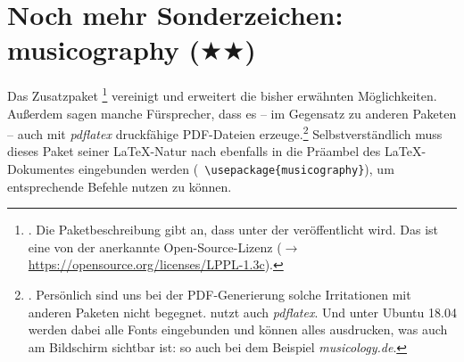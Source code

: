%
%
%



\section{Noch mehr Sonderzeichen: musicography ($\bigstar\bigstar$)}

Das Zusatzpaket \footnote{\cite[vgl.][\nopage
wp.]{CtanMusicography2018a}. Die Paketbeschreibung gibt an, dass
 unter der  veröffentlicht
wird. Das ist eine von der  anerkannte Open-Source-Lizenz
($\rightarrow$ \href{https://opensource.org/licenses/LPPL-1.3c}
{https://opensource.org/licenses/LPPL-1.3c}).} vereinigt und erweitert die
bisher erwähnten Möglichkeiten. Außerdem sagen manche Fürsprecher, dass es -- im
Gegensatz zu anderen Paketen -- auch mit \textit{pdflatex} druckfähige
PDF-Dateien erzeuge.\footnote{\cite[Vgl. dazu etwa][1]{Cashner2018a}. Persönlich
sind uns bei der PDF-Generierung solche Irritationen mit anderen Paketen nicht
begegnet.  nutzt auch \textit{pdflatex}. Und unter Ubuntu 18.04
werden dabei alle Fonts eingebunden und können alles ausdrucken, was auch am
Bildschirm sichtbar ist: so auch bei dem Beispiel \textit{musicology.de}.}
Selbstverständlich muss dieses Paket seiner \LaTeX-Natur nach ebenfalls in die
Präambel des \LaTeX-Dokumentes eingebunden werden (\texttt{\small
\textbackslash{usepackage\{musicography\}}}), um entsprechende Befehle nutzen zu
können.

